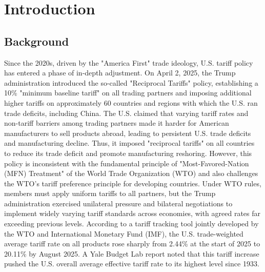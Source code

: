 \documentclass{apmcmthesis}
\begin{document}
\pagestyle{frontmatterstyle}

\begin{abstract}
\end{abstract}


\newpage
{
  \setlength{\parskip}{0pt}
  \tableofcontents
}

\newpage
\pagestyle{mainmatterstyle}
\setcounter{page}{1}

\section{Introduction}
\subsection{Background}
Since the 2020s, driven by the "America First" trade ideology, U.S. tariff policy has entered a phase of in-depth adjustment. On April 2, 2025, the Trump administration introduced the so-called "Reciprocal Tariffs" policy, establishing a 10\% "minimum baseline tariff" on all trading partners and imposing additional higher tariffs on approximately 60 countries and regions with which the U.S. ran trade deficits, including China. The U.S. claimed that varying tariff rates and non-tariff barriers among trading partners made it harder for American manufacturers to sell products abroad, leading to persistent U.S. trade deficits and manufacturing decline. Thus, it imposed "reciprocal tariffs" on all countries to reduce its trade deficit and promote manufacturing reshoring. However, this policy is inconsistent with the fundamental principle of "Most-Favored-Nation (MFN) Treatment" of the World Trade Organization (WTO) and also challenges the WTO's tariff preference principle for developing countries. Under WTO rules, members must apply uniform tariffs to all partners, but the Trump administration exercised unilateral pressure and bilateral negotiations to implement widely varying tariff standards across economies, with agreed rates far exceeding previous levels. According to a tariff tracking tool jointly developed by the WTO and International Monetary Fund (IMF), the U.S. trade-weighted average tariff rate on all products rose sharply from 2.44\% at the start of 2025 to 20.11\% by August 2025. A Yale Budget Lab report noted that this tariff increase pushed the U.S. overall average effective tariff rate to its highest level since 1933.
\end{document}
